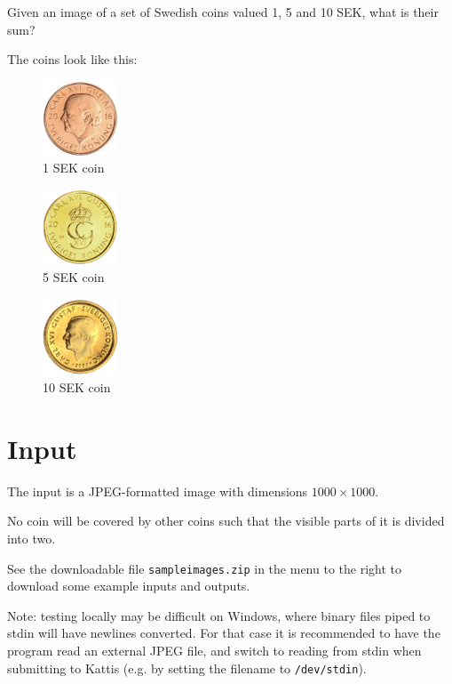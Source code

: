 Given an image of a set of Swedish coins valued 1, 5 and 10 SEK, what is their sum?

The coins look like this:
\begin{figure}[h]
  \centering
  \includegraphics[width=0.2\textwidth]{1.png}
  \caption{1 SEK coin}
\end{figure}
\begin{figure}[h]
  \centering
  \includegraphics[width=0.2\textwidth]{5.png}
  \caption{5 SEK coin}
\end{figure}
\begin{figure}[h]
  \centering
  \includegraphics[width=0.2\textwidth]{10.png}
  \caption{10 SEK coin}
\end{figure}

\section*{Input}
The input is a JPEG-formatted image with dimensions $1000 \times 1000$.

No coin will be covered by other coins such that the visible parts of it is divided into two.

See the downloadable file \texttt{sampleimages.zip} in the menu to the right to download some example inputs and outputs.

Note: testing locally may be difficult on Windows, where binary files piped to stdin will have newlines converted.
For that case it is recommended to have the program read an external JPEG file, and switch to reading from stdin
when submitting to Kattis (e.g. by setting the filename to \texttt{/dev/stdin}).

